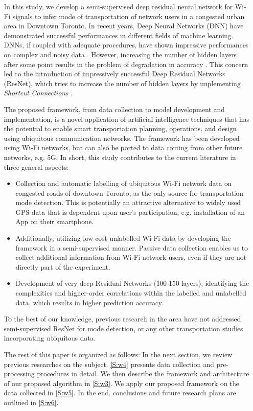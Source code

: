 In this study, we develop a semi-supervised deep residual neural network for Wi-Fi signals to infer mode of transportation of network users in a congested urban area in Downtown Toronto. In recent years, Deep Neural Networks (DNN) have demonstrated successful performances in different fields of machine learning. DNNs, if coupled with adequate procedures, have shown impressive performances on complex and noisy data \cite{reed2014training,rolnick2017deep}. However, increasing the number of hidden layers after some point results in the problem of degradation in accuracy \cite{he2016deep}. This concern led to the introduction of impressively successful Deep Residual Networks (ResNet), which tries to increase the number of hidden layers by implementing \textit{Shortcut Connections} \cite{he2016deep}. 

The proposed framework, from data collection to model development and implementation, is a novel application of artificial intelligence techniques that has the potential to enable smart transportation planning, operations, and design using ubiquitous communication networks. The framework has been developed using Wi-Fi networks, but can also be ported to data coming from other future networks, e.g. 5G. In short, this study contributes to the current literature in three general aspects:
\begin{itemize}
    \item Collection and automatic labelling of ubiquitous Wi-Fi network data on congested roads of downtown Toronto, as the only source for transportation mode detection. This is potentially an attractive alternative to widely used GPS data that is dependent upon user's participation, e.g. installation of an App on their smartphone.
    \item Additionally, utilizing low-cost unlabelled Wi-Fi data by developing the framework in a semi-supervised manner. Passive data collection enables us to collect additional information from Wi-Fi network users, even if they are not directly part of the experiment.
    \item Development of very deep Residual Networks (100-150 layers), identifying the complexities and higher-order correlations within the labelled and unlabelled data, which results in higher prediction accuracy.
\end{itemize}
\noindent To the best of our knowledge, previous research in the area have not addressed semi-supervised ResNet for mode detection, or any other transportation studies incorporating ubiquitous data.

The rest of this paper is organized as follows: In the next section, we review previous researches on the subject. \cref{S:w4} presents data collection and pre-processing procedures in detail. We then describe the framework and architecture of our proposed algorithm in \cref{S:w3}. We apply our proposed framework on the data collected in \cref{S:w5}. In the end, conclusions and future research plans are outlined in \cref{S:w6}.
